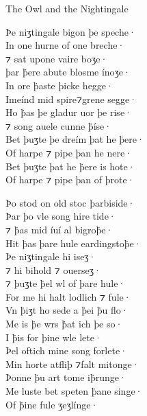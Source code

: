 \begin{texts}{The Owl and the Nightingale}
\begin{textglossed}
Þe niʒtingale bigon þe speche·\\
In one hurne of one breche·\\
⁊ sat upone vaire boʒe·\\
þar \.{þ}ere abute blosme ínoʒe·\\
In ore \.{þ}aste þicke hegge·\\
Imeínd mid spire⁊grene segge·\\
Ho \.{þ}as þe gladur uor þe rise·\\
⁊ song auele cunne \.{þ}íse·\\
Bet þuʒte þe dreím þat he \.{þ}ere·\\
Of harpe ⁊ pipe þan he nere·\\
Bet þuʒte þat he \.{þ}ere is hote·\\
Of harpe ⁊ pipe þan of þrote·
  
Þo stod on old stoc þarbiside·\\
Þar þo vle song hire tide·\\
⁊ \.{þ}as mid íuí al bigro\.{þ}e·\\
Hit \.{þ}as þare hule eardingsto\.{þ}e·\\
Þe niʒtingale hi iseʒ·\\
⁊ hi bihold ⁊ ouerseʒ·\\
⁊ þuʒte \.{þ}el wl of þare hule·\\
For me hi halt lodlich ⁊ fule·\\
Vn \.{þ}iʒt ho sede a \.{þ}ei \.{þ}u flo·\\
Me is \.{þ}e wrs \.{þ}at ich þe so·\\
I \.{þ}is for þine wle lete·\\
Þel oftich mine song forlete·\\
Min horte atfliþ ⁊falt mitonge·\\
Þonne \.{þ}u art tome i\.{þ}runge·\\
Me luste bet speten \.{þ}ane singe·\\
Of \.{þ}ine fule ʒeʒlínge·
\end{textglossed}


\end{texts}


